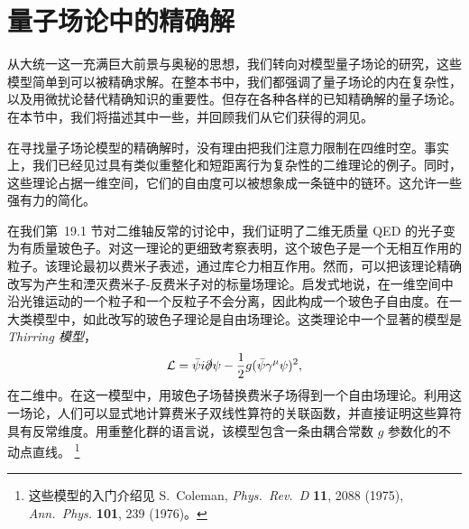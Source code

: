 \section{量子场论中的精确解}

从大统一这一充满巨大前景与奥秘的思想，我们转向对模型量子场论的研究，这些模型简单到可以被精确求解。在整本书中，我们都强调了量子场论的内在复杂性，以及用微扰论替代精确知识的重要性。但存在各种各样的已知精确解的量子场论。在本节中，我们将描述其中一些，并回顾我们从它们获得的洞见。

在寻找量子场论模型的精确解时，没有理由把我们注意力限制在四维时空。事实上，我们已经见过具有类似重整化和短距离行为复杂性的二维理论的例子。同时，这些理论占据一维空间，它们的自由度可以被想象成一条链中的链环。这允许一些强有力的简化。

在我们第~19.1 节对二维轴反常的讨论中，我们证明了二维无质量 QED 的光子变为有质量玻色子。对这一理论的更细致考察表明，这个玻色子是一个无相互作用的粒子。该理论最初以费米子表述，通过库仑力相互作用。然而，可以把该理论精确改写为产生和湮灭费米子-反费米子对的标量场理论。启发式地说，在一维空间中沿光锥运动的一个粒子和一个反粒子不会分离，因此构成一个玻色子自由度。在一大类模型中，如此改写的玻色子理论是自由场理论。这类理论中一个显著的模型是\emph{Thirring 模型}，
\begin{equation}
  \mathcal{L} = \bar{\psi}i\slashed{\partial}\psi
    - \frac{1}{2}g(\bar{\psi}\gamma^\mu\psi)^2 ,
  \label{eq:22.14}
\end{equation}
在二维中。在这一模型中，用玻色子场替换费米子场得到一个自由场理论。利用这一场论，人们可以显式地计算费米子双线性算符的关联函数，并直接证明这些算符具有反常维度。用重整化群的语言说，该模型包含一条由耦合常数 $g$ 参数化的不动点直线。%
\footnote{这些模型的入门介绍见 S.~Coleman, \emph{Phys.\ Rev.\ D} \textbf{11}, 2088 (1975), \emph{Ann.\ Phys.} \textbf{101}, 239 (1976)。}

